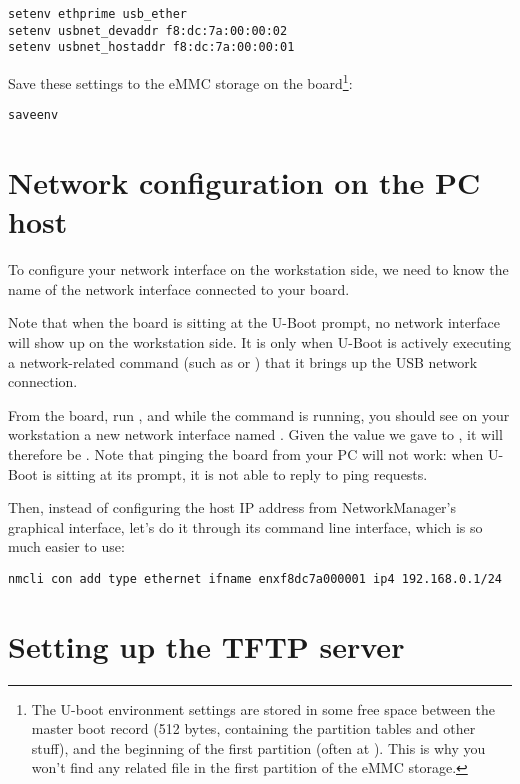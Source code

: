 \begin{verbatim}
setenv ethprime usb_ether
setenv usbnet_devaddr f8:dc:7a:00:00:02
setenv usbnet_hostaddr f8:dc:7a:00:00:01
\end{verbatim}

Save these settings to the eMMC storage on the board\footnote{
The U-boot environment settings are stored in some free space
between the master boot record (512 bytes, containing the partition
tables and other stuff), and the beginning of the first partition (often
at ). This is why you won't find any related file in the
first partition of the eMMC storage.}:

\begin{verbatim}
saveenv
\end{verbatim}

\section{Network configuration on the PC host}

To configure your network interface on the workstation side, we need
to know the name of the network interface connected to your board.

Note that when the board is sitting at the U-Boot prompt, no network
interface will show up on the workstation side. It is only when U-Boot
is actively executing a network-related command (such as 
or ) that it brings up the USB network connection.

From the board, run , and while the 
command is running, you should see on your workstation a new network
interface named . Given the value we gave to
, it will therefore be
. Note that pinging the board from your PC will
not work: when U-Boot is sitting at its prompt, it is not able to
reply to ping requests.

Then, instead of configuring the host IP address from NetworkManager's
graphical interface, let's do it through its command line interface,
which is so much easier to use:

\begin{verbatim}
nmcli con add type ethernet ifname enxf8dc7a000001 ip4 192.168.0.1/24
\end{verbatim}

\section{Setting up the TFTP server}

